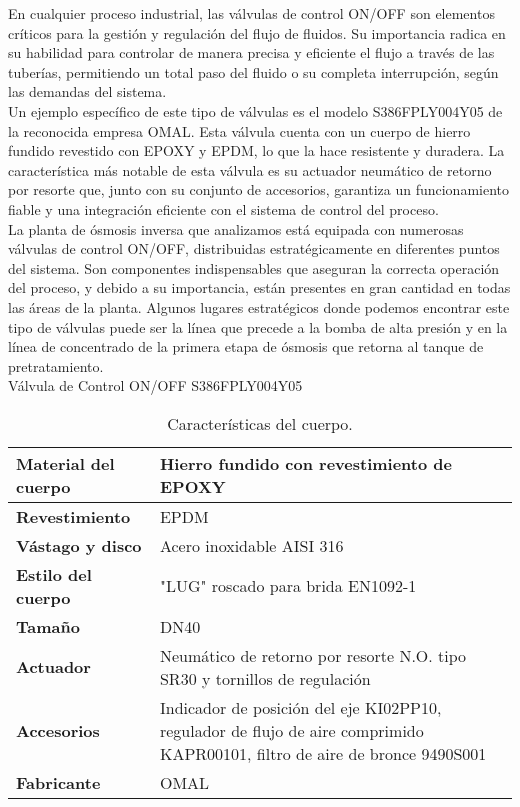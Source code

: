 En cualquier proceso industrial, las válvulas de control ON/OFF son elementos críticos para la gestión y regulación del flujo de fluidos. Su importancia radica en su habilidad para controlar de manera precisa y eficiente el flujo a través de las tuberías, permitiendo un total paso del fluido o su completa interrupción, según las demandas del sistema.\\

Un ejemplo específico de este tipo de válvulas es el modelo S386FPLY004Y05 de la reconocida empresa OMAL. Esta válvula cuenta con un cuerpo de hierro fundido revestido con EPOXY y EPDM, lo que la hace resistente y duradera. La característica más notable de esta válvula es su actuador neumático de retorno por resorte que, junto con su conjunto de accesorios, garantiza un funcionamiento fiable y una integración eficiente con el sistema de control del proceso.\\

La planta de ósmosis inversa que analizamos está equipada con numerosas válvulas de control ON/OFF, distribuidas estratégicamente en diferentes puntos del sistema. Son componentes indispensables que aseguran la correcta operación del proceso, y debido a su importancia, están presentes en gran cantidad en todas las áreas de la planta. Algunos lugares estratégicos donde podemos encontrar este tipo de válvulas puede ser la línea que precede a la bomba de alta presión y en la línea de concentrado de la primera etapa de ósmosis que retorna al tanque de pretratamiento.\\

Válvula de Control ON/OFF S386FPLY004Y05\\

\begin{table}[H]
    \centering
    \caption{Características del cuerpo.}
    \label{table:valvula_on_off}
    \begin{tabular}{| L{5cm} | L{5cm} |}
        \hline
        \textbf{Material del cuerpo} & Hierro fundido con revestimiento de EPOXY \\
        \hline
        \textbf{Revestimiento} & EPDM \\
        \hline
        \textbf{Vástago y disco} & Acero inoxidable AISI 316 \\
        \hline
        \textbf{Estilo del cuerpo} & "LUG" roscado para brida EN1092-1 \\
        \hline
        \textbf{Tamaño} & DN40 \\
        \hline
        \textbf{Actuador} & Neumático de retorno por resorte N.O. tipo SR30 y tornillos de regulación \\
        \hline
        \textbf{Accesorios} & Indicador de posición del eje KI02PP10, regulador de flujo de aire comprimido KAPR00101, filtro de aire de bronce 9490S001 \\
        \hline
        \textbf{Fabricante} & OMAL \\
        \hline
    \end{tabular}
\end{table}


